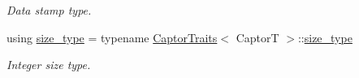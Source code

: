 \begin{DoxyCompactItemize}
\begin{DoxyCompactList}\small\item\em Data stamp type. \end{DoxyCompactList}\item 
\mbox{\label{classflow_1_1_captor_interface_a62db6a158eebcb377e63ede6a1f1a8c6}} 
using \hyperlink{classflow_1_1_captor_interface_a62db6a158eebcb377e63ede6a1f1a8c6}{size\+\_\+type} = typename \hyperlink{structflow_1_1_captor_traits}{Captor\+Traits}$<$ CaptorT $>$\+::\hyperlink{classflow_1_1_captor_interface_a62db6a158eebcb377e63ede6a1f1a8c6}{size\+\_\+type}
\begin{DoxyCompactList}\small\item\em Integer size type. \end{DoxyCompactList}\end{DoxyCompactItemize}
